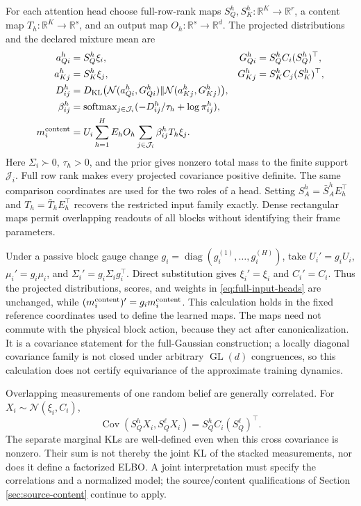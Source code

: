 \documentclass[11pt,letterpaper]{article}
\newcommand{\R}{\mathbb R}
\newcommand{\KL}{D_{\mathrm{KL}}}
\newcommand{\GL}{\operatorname{GL}}
\newcommand{\softmax}{\operatorname{softmax}}
\newcommand{\diag}{\operatorname{diag}}
\newcommand{\Cov}{\operatorname{Cov}}
\theoremstyle{remark}
\begin{document}
For each attention head choose full-row-rank maps $S_Q^h,S_K^h:\R^K\to\R^r$, a content map $T_h:\R^K\to\R^s$, and an output map $O_h:\R^s\to\R^d$. The projected distributions and the declared mixture mean are
\begin{align}
 a_{Qi}^h&=S_Q^h\xi_i,& G_{Qi}^h&=S_Q^hC_i(S_Q^h)^\top,\\
 a_{Kj}^h&=S_K^h\xi_j,& G_{Kj}^h&=S_K^hC_j(S_K^h)^\top,\\
 D_{ij}^h&=\KL\big(\mathcal N(a_{Qi}^h,G_{Qi}^h)\|\mathcal N(a_{Kj}^h,G_{Kj}^h)\big),\\
 \beta_{ij}^h&=\softmax_{j\in\mathcal J_i}(-D_{ij}^h/\tau_h+\log\pi_{ij}^h),\\
 m_i^{\rm content}&=U_i\sum_{h=1}^H E_hO_h\sum_{j\in\mathcal J_i}\beta_{ij}^hT_h\xi_j.
 \label{eq:full-input-heads}
\end{align}
Here $\Sigma_i\succ0$, $\tau_h>0$, and the prior gives nonzero total mass to the finite support $\mathcal J_i$. Full row rank makes every projected covariance positive definite. The same comparison coordinates are used for the two roles of a head. Setting $S_A^h=\bar S_A^hE_h^\top$ and $T_h=\bar T_hE_h^\top$ recovers the restricted input family exactly. Dense rectangular maps permit overlapping readouts of all blocks without identifying their frame parameters.

Under a passive block gauge change $g_i=\diag(g_i^{(1)},\ldots,g_i^{(H)})$, take $U_i'=g_iU_i$, $\mu_i'=g_i\mu_i$, and $\Sigma_i'=g_i\Sigma_ig_i^\top$. Direct substitution gives $\xi_i'=\xi_i$ and $C_i'=C_i$. Thus the projected distributions, scores, and weights in \eqref{eq:full-input-heads} are unchanged, while $(m_i^{\rm content})'=g_i m_i^{\rm content}$. This calculation holds in the fixed reference coordinates used to define the learned maps. The maps need not commute with the physical block action, because they act after canonicalization. It is a covariance statement for the full-Gaussian construction; a locally diagonal covariance family is not closed under arbitrary $\GL(d)$ congruences, so this calculation does not certify equivariance of the approximate training dynamics.

Overlapping measurements of one random belief are generally correlated. For $X_i\sim\mathcal N(\xi_i,C_i)$,
\begin{equation}
 \Cov(S_Q^hX_i,S_Q^\ell X_i)=S_Q^h C_i(S_Q^\ell)^\top.
\end{equation}
The separate marginal KLs are well-defined even when this cross covariance is nonzero. Their sum is not thereby the joint KL of the stacked measurements, nor does it define a factorized ELBO. A joint interpretation must specify the correlations and a normalized model; the source/content qualifications of Section \ref{sec:source-content} continue to apply.
\end{document}
